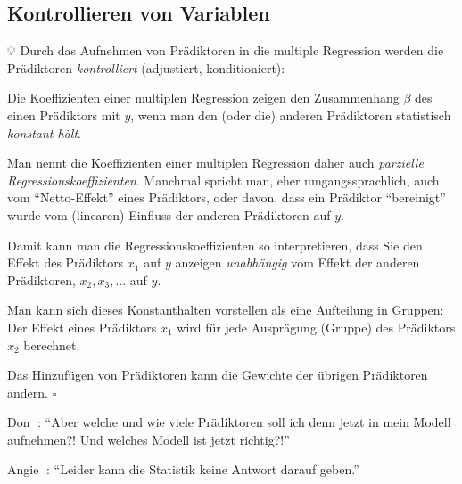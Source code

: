 \documentclass[
  ngerman,
  letterpaper,
  twoside,
  open=any]{scrbook}
\theoremstyle{definition}
\theoremstyle{plain}
\theoremstyle{definition}
\theoremstyle{definition}
\theoremstyle{definition}
\theoremstyle{definition}
\theoremstyle{remark}
\begin{document}
\subsection{Kontrollieren von
Variablen}\label{kontrollieren-von-variablen}

💡 Durch das Aufnehmen von Prädiktoren in die multiple Regression werden
die Prädiktoren \emph{kontrolliert} (adjustiert, konditioniert):

Die Koeffizienten einer multiplen Regression zeigen den Zusammenhang
\(\beta\) des einen Prädiktors mit \(y\), wenn man den (oder die)
anderen Prädiktoren statistisch \emph{konstant hält}.

Man nennt die Koeffizienten einer multiplen Regression daher auch
\emph{parzielle Regressionskoeffizienten}. Manchmal spricht man, eher
umgangssprachlich, auch vom \enquote{Netto-Effekt} eines Prädiktors,
oder davon, dass ein Prädiktor \enquote{bereinigt} wurde vom (linearen)
Einfluss der anderen Prädiktoren auf \(y\).

Damit kann man die Regressionskoeffizienten so interpretieren, dass Sie
den Effekt des Prädiktors \(x_1\) auf \(y\) anzeigen \emph{unabhängig}
vom Effekt der anderen Prädiktoren, \(x_2,x_3,...\) auf \(y\).

Man kann sich dieses Konstanthalten vorstellen als eine Aufteilung in
Gruppen: Der Effekt eines Prädiktors \(x_1\) wird für jede Ausprägung
(Gruppe) des Prädiktors \(x_2\) berechnet.

\begin{tcolorbox}[enhanced jigsaw, arc=.35mm, bottomrule=.15mm, bottomtitle=1mm, breakable, colback=white, colbacktitle=quarto-callout-important-color!10!white, colframe=quarto-callout-important-color-frame, coltitle=black, left=2mm, leftrule=.75mm, opacityback=0, opacitybacktitle=0.6, rightrule=.15mm, title=\textcolor{quarto-callout-important-color}{\faExclamation}\hspace{0.5em}{Wichtig}, titlerule=0mm, toprule=.15mm, toptitle=1mm]

Das Hinzufügen von Prädiktoren kann die Gewichte der übrigen Prädiktoren
ändern. \(\square\)

\end{tcolorbox}

Don 🧑: \enquote{Aber welche und wie viele Prädiktoren soll ich denn
jetzt in mein Modell aufnehmen?! Und welches Modell ist jetzt richtig?!}

Angie 👩: \enquote{Leider kann die Statistik keine Antwort darauf
geben.}
\end{document}
